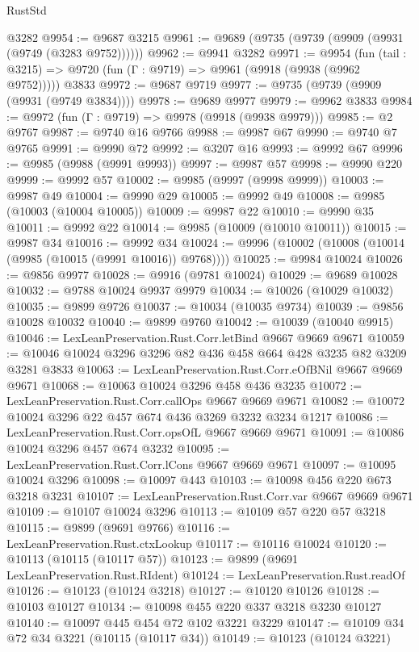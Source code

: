 \begin{lexlean}{RustStd}
\begin{coremodule}
    @3282
@9954 := @9687 @3215
@9961 := @9689 (@9735 (@9739 (@9909 (@9931 (@9749 (@3283 @9752))))))
@9962 := @9941 @3282
@9971 := @9954
    (fun (tail : @3215) => @9720 (fun (Γ : @9719) => @9961 (@9918 (@9938 (@9962 @9752)))))
    @3833
@9972 := @9687 @9719
@9977 := @9735 (@9739 (@9909 (@9931 (@9749 @3834))))
@9978 := @9689 @9977
@9979 := @9962 @3833
@9984 := @9972 (fun (Γ : @9719) => @9978 (@9918 (@9938 @9979)))
@9985 := @2 @9767
@9987 := @9740 @16 @9766
@9988 := @9987 @67
@9990 := @9740 @7 @9765
@9991 := @9990 @72
@9992 := @3207 @16
@9993 := @9992 @67
@9996 := @9985 (@9988 (@9991 @9993))
@9997 := @9987 @57
@9998 := @9990 @220
@9999 := @9992 @57
@10002 := @9985 (@9997 (@9998 @9999))
@10003 := @9987 @49
@10004 := @9990 @29
@10005 := @9992 @49
@10008 := @9985 (@10003 (@10004 @10005))
@10009 := @9987 @22
@10010 := @9990 @35
@10011 := @9992 @22
@10014 := @9985 (@10009 (@10010 @10011))
@10015 := @9987 @34
@10016 := @9992 @34
@10024 := @9996 (@10002 (@10008 (@10014 (@9985 (@10015 (@9991 @10016)) @9768))))
@10025 := @9984 @10024
@10026 := @9856 @9977
@10028 := @9916 (@9781 @10024)
@10029 := @9689 @10028
@10032 := @9788 @10024 @9937 @9979
@10034 := @10026 (@10029 @10032)
@10035 := @9899 @9726
@10037 := @10034 (@10035 @9734)
@10039 := @9856 @10028 @10032
@10040 := @9899 @9760
@10042 := @10039 (@10040 @9915)
@10046 := LexLeanPreservation.Rust.Corr.letBind @9667 @9669 @9671
@10059 := @10046 @10024 @3296 @3296 @82 @436 @458 @664 @428 @3235 @82 @3209 @3281 @3833
@10063 := LexLeanPreservation.Rust.Corr.eOfBNil @9667 @9669 @9671
@10068 := @10063 @10024 @3296 @458 @436 @3235
@10072 := LexLeanPreservation.Rust.Corr.callOps @9667 @9669 @9671
@10082 := @10072 @10024 @3296 @22 @457 @674 @436 @3269 @3232 @3234 @1217
@10086 := LexLeanPreservation.Rust.Corr.opsOfL @9667 @9669 @9671
@10091 := @10086 @10024 @3296 @457 @674 @3232
@10095 := LexLeanPreservation.Rust.Corr.lCons @9667 @9669 @9671
@10097 := @10095 @10024 @3296
@10098 := @10097 @443
@10103 := @10098 @456 @220 @673 @3218 @3231
@10107 := LexLeanPreservation.Rust.Corr.var @9667 @9669 @9671
@10109 := @10107 @10024 @3296
@10113 := @10109 @57 @220 @57 @3218
@10115 := @9899 (@9691 @9766)
@10116 := LexLeanPreservation.Rust.ctxLookup
@10117 := @10116 @10024
@10120 := @10113 (@10115 (@10117 @57))
@10123 := @9899 (@9691 LexLeanPreservation.Rust.RIdent)
@10124 := LexLeanPreservation.Rust.readOf
@10126 := @10123 (@10124 @3218)
@10127 := @10120 @10126
@10128 := @10103 @10127
@10134 := @10098 @455 @220 @337 @3218 @3230 @10127
@10140 := @10097 @445 @454 @72 @102 @3221 @3229
@10147 := @10109 @34 @72 @34 @3221 (@10115 (@10117 @34))
@10149 := @10123 (@10124 @3221)

\end{coremodule}
\end{lexlean}
